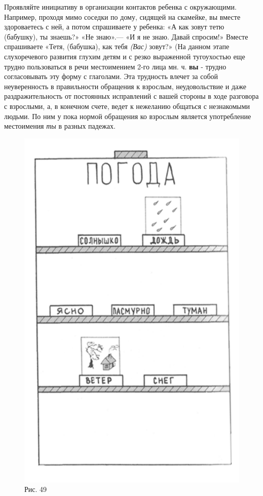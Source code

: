\documentclass[a5paper]{book}
\renewcommand{\emph}[1]{\textit{#1}}
\begin{document}
Проявляйте инициативу в организации контактов ребенка с окружающими.
Например, проходя мимо соседки по дому, сидящей на скамейке, вы вместе
здороваетесь с ней, а потом спрашиваете у ребенка: «А как зовут тетю
(бабушку), ты знаешь?» «Не знаю».--- «И я не знаю. Давай спросим!»
Вместе спрашиваете «Тетя, (бабушка), как тебя \emph{(Вас)} зовут?» (На
данном этапе слухоречевого развития глухим детям и с резко выраженной
тугоухостью еще трудно пользоваться в речи местоимением 2-го лица мн. ч.
\textbf{вы} - трудно согласовывать эту форму с глаголами. Эта трудность
влечет за собой неуверенность в правильности обращения к взрослым,
неудовольствие и даже раздражительность от постоянных исправлений с
вашей стороны в ходе разговора с взрослыми, а, в конечном счете, ведет к
нежеланию общаться с незнакомыми людьми. По ним у пока нормой обращения
ко взрослым является употребление местоимения \emph{ты} в разных
падежах.

\begin{figure}
\centering
\includegraphics[width=0.9\linewidth]{media/media/image45.png}
\caption*{Рис. 49}
\end{figure}
\end{document}
